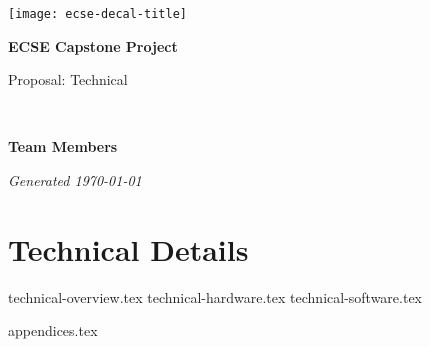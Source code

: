 \documentclass{capstone}
\begin{document}

\titlepage
	{\texttt{[image: ecse-decal-title]}}
	{
		\centering\sffamily
		{\Huge\bfseries ECSE Capstone Project\par}
		\vspace{16pt} 
		{\LARGE Proposal: Technical\par} 
		\vspace{24pt}
		{\huge\bfseries \teamname\par} %
	}


~\vfill

\noindent \textbf{Team Members}
\teammembers

\noindent \textit{Generated \today}

\tableofcontents

\cleardoublepage

\part{Technical Details}
{technical-overview.tex}
{technical-hardware.tex}
{technical-software.tex}

\begin{appendices}
{appendices.tex}
\end{appendices}
\end{document}
